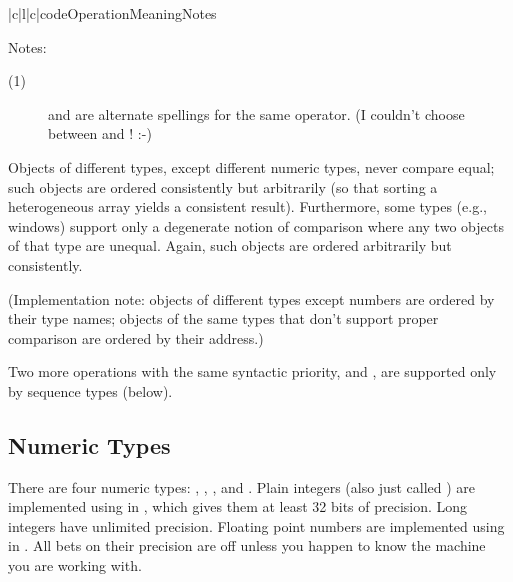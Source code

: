 \begin{tableiii}{|c|l|c|}{code}{Operation}{Meaning}{Notes}
\end{tableiii}
\opindex{==} %

\noindent
Notes:

\begin{description}

\item[(1)]
\code{<>} and \code{!=} are alternate spellings for the same operator.
(I couldn't choose between \ABC{} and \C{}! :-)

\end{description}

Objects of different types, except different numeric types, never
compare equal; such objects are ordered consistently but arbitrarily
(so that sorting a heterogeneous array yields a consistent result).
Furthermore, some types (e.g., windows) support only a degenerate
notion of comparison where any two objects of that type are unequal.
Again, such objects are ordered arbitrarily but consistently.

(Implementation note: objects of different types except numbers are
ordered by their type names; objects of the same types that don't
support proper comparison are ordered by their address.)

Two more operations with the same syntactic priority,  and
, are supported only by sequence types (below).

\subsection{Numeric Types}

There are four numeric types: , , 
, and .
Plain integers (also just called )
are implemented using  in \C{}, which gives them at least 32
bits of precision.  Long integers have unlimited precision.  Floating
point numbers are implemented using  in \C{}.  All bets on
their precision are off unless you happen to know the machine you are
working with.

